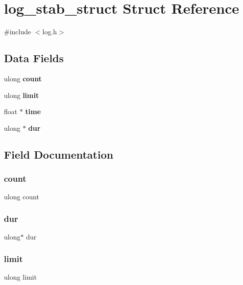 \section{log\+\_\+stab\+\_\+struct Struct Reference}
\label{structlog__stab__struct}


{\ttfamily \#include $<$log.\+h$>$}

\subsection*{Data Fields}
\begin{DoxyCompactItemize}
\item 
ulong \textbf{ count}
\item 
ulong \textbf{ limit}
\item 
float $\ast$ \textbf{ time}
\item 
ulong $\ast$ \textbf{ dur}
\end{DoxyCompactItemize}


\subsection{Field Documentation}
\mbox{\label{structlog__stab__struct_aec2cfcb08132e96314e07b96dcda60fe}} 
\subsubsection{count}
{\footnotesize\ttfamily ulong count}

\mbox{\label{structlog__stab__struct_a9b72b5e4d4f698f873cbf1cbf431aaa7}} 
\subsubsection{dur}
{\footnotesize\ttfamily ulong$\ast$ dur}

\mbox{\label{structlog__stab__struct_a1aafeaebc23c5017e813ab4816d159e8}} 
\subsubsection{limit}
{\footnotesize\ttfamily ulong limit}

